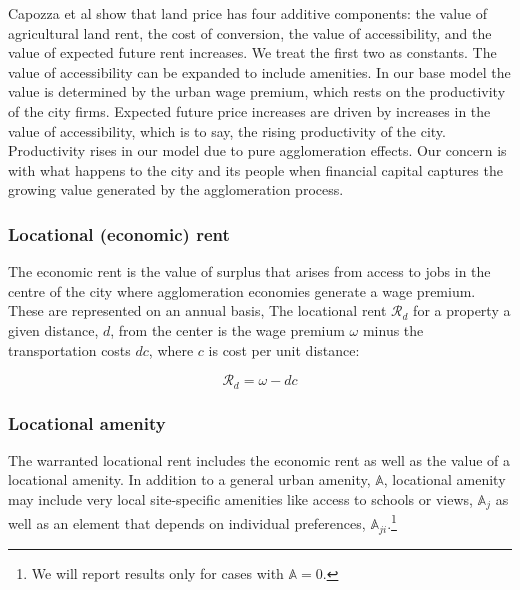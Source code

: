 Capozza et al \cite{capozzaFundamentalsLandPrices1989} show that land price has four additive components: the value of agricultural land rent, the cost of conversion, the value of accessibility, and the value of expected future rent increases. We treat the first two as constants. The value of accessibility  can be expanded to include amenities. In our base model the value is determined by the urban wage premium, which rests on the productivity of the city firms. %
Expected future price increases are driven by increases in the value of accessibility, which is to say, the rising productivity of the city. Productivity rises in our model due to pure agglomeration effects. Our concern is with what happens to the city and its people when financial capital captures the growing value generated by the agglomeration process.  


\subsubsection{Locational (economic) rent} \label{section-economic-rent}
The \gls{economic rent} is the value of surplus that arises from access to jobs in the centre of the city where agglomeration economies generate a wage premium. These are represented  on an annual basis, 
The locational rent $\mathcal{R}_d$ for a property a given distance, $d$, from the center is the wage premium $\omega$ minus the transportation costs $dc$, where $c$ is cost per unit distance:

\[\mathcal{R}_d= \omega - {dc}\]

\subsubsection{Locational amenity} \label{section-locational-rent}
The warranted locational rent includes the economic rent as well as the value of a locational amenity. In addition to a general urban amenity, $\mathbb{A}$, locational amenity may include very local site-specific amenities like access to schools or views, $\mathbb{A}_j$ as well as an element that depends on individual preferences, $\mathbb{A}_{ji}$.\footnote{We will report results only for cases with $\mathbb{A}=0$. }   %

